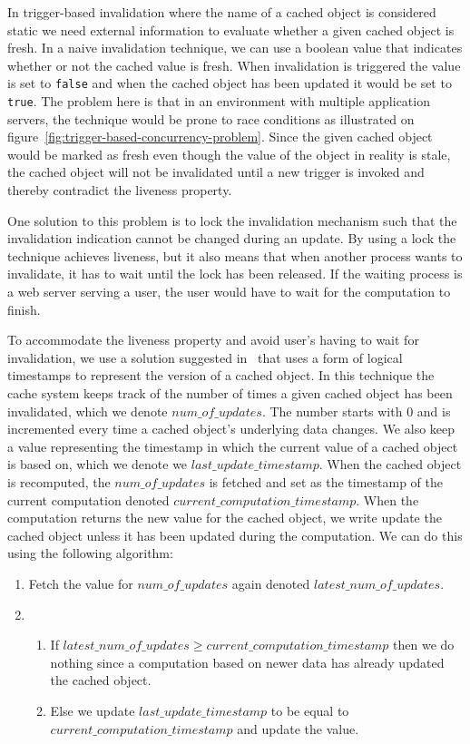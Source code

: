 In trigger-based invalidation where the name of a cached object is considered static we need external information to evaluate whether a given cached object is fresh. In a naive invalidation technique, we can use a boolean value that indicates whether or not the cached value is fresh. When invalidation is triggered the value is set to \verb$false$ and when the cached object has been updated it would be set to \verb$true$. The problem here is that in an environment with multiple application servers, the technique would be prone to race conditions as illustrated on figure~\ref{fig:trigger-based-concurrency-problem}. Since the given cached object would be marked as fresh even though the value of the object in reality is stale, the cached object will not be invalidated until a new trigger is invoked and thereby contradict the liveness property.

One solution to this problem is to lock the invalidation mechanism such that the invalidation indication cannot be changed during an update. By using a lock the technique achieves liveness, but it also means that when another process wants to invalidate, it has to wait until the lock has been released. If the waiting process is a web server serving a user, the user would have to wait for the computation to finish.

To accommodate the liveness property and avoid user's having to wait for invalidation, we use a solution suggested in~\cite{paper:ibm-extended} that uses a form of logical timestamps to represent the version of a cached object. In this technique the cache system keeps track of the number of times a given cached object has been invalidated, which we denote $num\_of\_updates$. The number starts with $0$ and is incremented every time a cached object's underlying data changes.
We also keep a value representing the timestamp in which the current value of a cached object is based on, which we denote we $last\_update\_timestamp$. When the cached object is recomputed, the $num\_of\_updates$ is fetched and set as the timestamp of the current computation denoted $current\_computation\_timestamp$.
When the computation returns the new value for the cached object, we write update the cached object unless it has been updated during the computation. We can do this using the following algorithm:

\begin{enumerate}
  \item Fetch the value for $num\_of\_updates$ again denoted $latest\_num\_of\_updates$.
  \item
    \begin{enumerate}
      \item If $latest\_num\_of\_updates \geq current\_computation\_timestamp$ then we do nothing since a computation based on newer data has already updated the cached object.
      \item Else we update $last\_update\_timestamp$ to be equal to \\ $current\_computation\_timestamp$ and update the value.
    \end{enumerate}
\end{enumerate}

